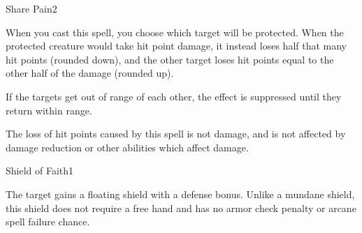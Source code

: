 \begin{spellsection}{Share Pain}{2}
    \begin{spellheader}
    \end{spellheader}
    \begin{spellcontent}
        \begin{spelltargetinginfo}
        \end{spelltargetinginfo}
        \begin{spelleffects}
            \spellspecial When you cast this spell, you choose which target will be protected.
            \spelleffect When the protected creature would take hit point damage, it instead loses half that many hit points (rounded down), and the other target loses hit points equal to the other half of the damage (rounded up).

            If the targets get out of range of each other, the effect is suppressed until they return within range.
            \spelldur \durlong \dismissable
        \end{spelleffects}
    \end{spellcontent}
    \begin{spellfooter}
        \spellnotes The loss of hit points caused by this spell is not damage, and is not affected by damage reduction or other abilities which affect damage.
        \miscastexplode
    \end{spellfooter}
\end{spellsection}

\begin{spellsection}{Shield of Faith}{1}
    \begin{spellheader}
    \end{spellheader}
    \begin{spellcontent}
        \begin{spelltargetinginfo}
        \end{spelltargetinginfo}
        \begin{spelleffects}
            \spelleffect The target gains a floating shield with a  defense bonus. Unlike a mundane shield, this shield does not require a free hand and has no armor check penalty or arcane spell failure chance.
            \spelldur \durpersonallong
        \end{spelleffects}
    \end{spellcontent}
    \begin{spellfooter}
        \miscastexplode
    \end{spellfooter}
\end{spellsection}

